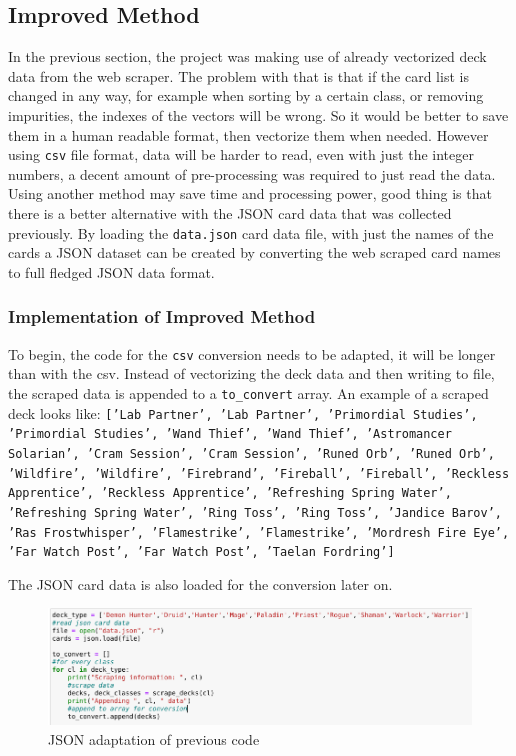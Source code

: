 \documentclass{report} %
\begin{document}
\subsection{Improved Method}
In the previous section, the project was making use of already vectorized deck data from the web scraper. The problem with that is that if the card list is changed in any way, for example when sorting by a certain class, or removing impurities, the indexes of the vectors will be wrong. So it would be better to save them in a human readable format, then vectorize them when needed. However using \nolinkurl{csv} file format, data will be harder to read, even with just the integer numbers, a decent amount of pre-processing was required to just read the data. Using another method may save time and processing power, good thing is that there is a better alternative with the JSON card data that was collected previously. By loading the \nolinkurl{data.json} card data file, with just the names of the cards a JSON dataset can be created by converting the web scraped card names to full fledged JSON data format.
\subsubsection{Implementation of Improved Method}

To begin, the code for the \nolinkurl{csv} conversion needs to be adapted, it will be longer than with the csv. Instead of vectorizing the deck data and then writing to file, the scraped data is appended to a \nolinkurl{to_convert} array. An example of a scraped deck looks like:
\texttt{['Lab Partner', 'Lab Partner', 'Primordial Studies', 'Primordial Studies', 'Wand Thief', 'Wand Thief', 'Astromancer Solarian', 'Cram Session', 'Cram Session', 'Runed Orb', 'Runed Orb', 'Wildfire', 'Wildfire', 'Firebrand', 'Fireball', 'Fireball', 'Reckless Apprentice', 'Reckless Apprentice', 'Refreshing Spring Water', 'Refreshing Spring Water', 'Ring Toss', 'Ring Toss', 'Jandice Barov', 'Ras Frostwhisper', 'Flamestrike', 'Flamestrike', 'Mordresh Fire Eye', 'Far Watch Post', 'Far Watch Post', 'Taelan Fordring']}


The JSON card data is also loaded for the conversion later on.
\begin{figure}[H]
\centering
\includegraphics[width=1.25\textwidth]{improvedDC}
\caption{JSON adaptation of previous code\protect}
 \label{board}
\end{figure}
\end{document}
